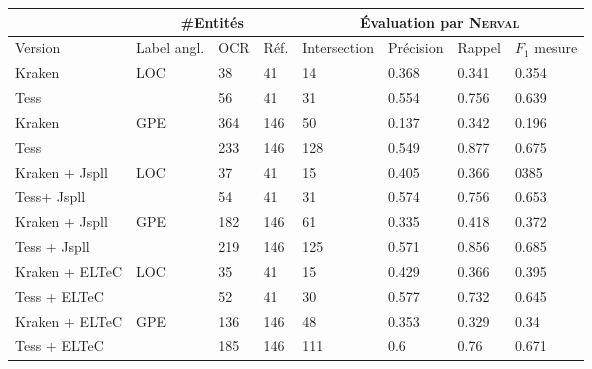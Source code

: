 \footnotesize{
\begin{tabular}{|l|l|l|l|l|l|l|l|}
\hline
 & \multicolumn{3}{c|}{{\#Entités}} & \multicolumn{4}{c|}{\'Evaluation par \textsc{Nerval}}\\
 \hline
Version & Label angl.&OCR & Réf. &Intersection& Précision & Rappel & $F_1$ mesure\\

 \hline
Kraken  & LOC& 38 &41&14   & 0.368   & 0.341&0.354 \\
Tess & & 56&41  &31 &0.554     &0.756 &0.639  \\
\hline
Kraken &GPE& 364 & 146 & 50& 0.137 &0.342 & 0.196 \\
Tess && 233 &146  &128 & 0.549     & 0.877  &0.675  \\
\hline
\hline
Kraken + Jspll&LOC & 37 & 41&15 & 0.405    &0.366 & 0385   %
\\
Tess+ Jspll & &54  &41 &31     &0.574     &0.756  &0.653 %
\\
\hline
Kraken  + Jspll &GPE& 182&146 &61& 0.335& 0.418    & 0.372   %
\\
Tess + Jspll   & & 219&146      &125     &0.571   &0.856 &0.685\\
 \hline
\hline
Kraken + ELTeC & LOC&35&41  &15 &0.429    &0.366  & 0.395 \\%
Tess + ELTeC&&52  &41  &30 & 0.577    &0.732  &0.645 \\
\hline
Kraken + ELTeC & GPE&136& 146 &48 &0.353    &0.329  &0.34  \\%

Tess + ELTeC&&185  &146  &111 &0.6     &0.76  &0.671 \\

\hline
\end{tabular}}